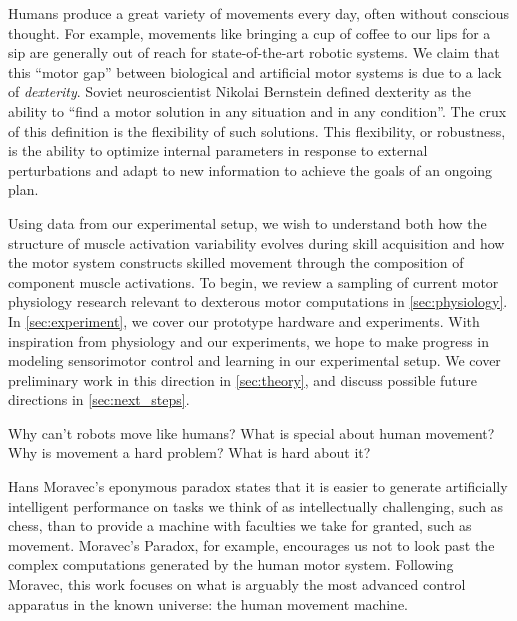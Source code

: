 \documentclass[../main.tex]{subfiles}
\begin{document}
Humans produce a great variety of movements every day, often without conscious thought. For example, movements like bringing a cup of coffee to our lips for a sip are generally out of reach for state-of-the-art robotic systems. We claim that this ``motor gap'' between biological and artificial motor systems is due to a lack of \emph{dexterity}. Soviet neuroscientist Nikolai Bernstein defined dexterity as the ability to ``find a motor solution in any situation and in any condition\cite{Bernstein1967}''. The crux of this definition is the flexibility of such solutions. This flexibility, or robustness\cite{kitanoBiologicalRobustness2004}, is the ability to optimize internal parameters in response to external perturbations and adapt to new information to achieve the goals of an ongoing plan.

Using data from our experimental setup, we wish to understand both how the structure of muscle activation variability evolves during skill acquisition and how the motor system constructs skilled movement through the composition of component muscle activations. To begin, we review a  sampling of current motor physiology research relevant to dexterous motor computations in \cref{sec:physiology}. In \cref{sec:experiment}, we cover our prototype hardware and experiments. With inspiration from physiology and our experiments, we hope to make progress in modeling sensorimotor control and learning in our experimental setup. We cover preliminary work in this direction in \cref{sec:theory}, and discuss possible future directions in \cref{sec:next_steps}.

Why can't robots move like humans? What is special about human movement? Why is movement a hard problem? What is hard about it?

Hans Moravec's eponymous paradox states that it is easier to generate artificially intelligent performance on tasks we think of as intellectually challenging, such as chess, than to provide a machine with faculties we take for granted, such as movement. Moravec's Paradox, for example, encourages us not to look past the complex computations generated by the human motor system. Following Moravec, this work focuses on what is arguably the most advanced control apparatus in the known universe: the human movement machine.
\end{document}
